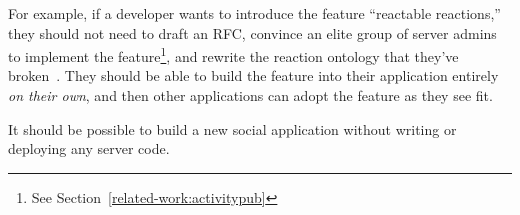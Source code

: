 For example, if a developer wants to introduce the feature
``reactable reactions,'' they should not need to draft an RFC,
convince an elite group of server admins to implement the feature\footnote{
    See Section~\ref{related-work:activitypub}
},
and rewrite the reaction ontology that they've broken~\cite{ecosystemmoving, herdingdnscamel, semanticwebtwodecades}.
They should be able to build the feature into their application
entirely \emph{on their own}, and then other applications can adopt the
feature as they see fit.




\begin{requirement}[Serverless]
\label{requirements:serverless}
    It should be possible to build a new social application without writing or deploying any server code.
\end{requirement}

